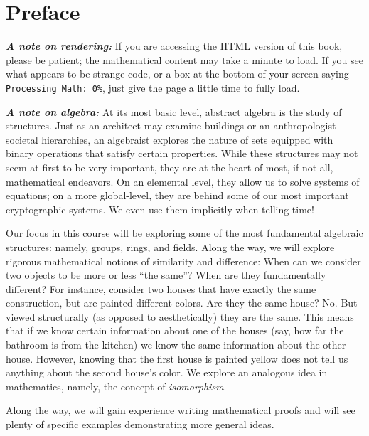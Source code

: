 \documentclass[10pt,openany,oneside]{book}
\newcommand{\alert}[1]{\textbf{\textit{#1}}}
\theoremstyle{plain}
\theoremstyle{definition}
\theoremstyle{definition}
\theoremstyle{definition}
\theoremstyle{definition}
\numberwithin{equation}{section}
\begin{document}
\chapter*{Preface}\label{preface-1}
\alert{A note on rendering:} If you are accessing the HTML version of this book, please be patient; the mathematical content may take a minute to load. If you see what appears to be strange code, or a box at the bottom of your screen saying \lstinline?Processing Math: 0%?, just give the page a little time to fully load.%
\par
\alert{A note on algebra:} At its most basic level, abstract algebra is the study of structures. Just as an architect may examine buildings or an anthropologist societal hierarchies, an algebraist explores the nature of sets equipped with binary operations that satisfy certain properties. While these structures may not seem at first to be very important, they are at the heart of most, if not all, mathematical endeavors. On an elemental level, they allow us to solve systems of equations; on a more global-level, they are behind some of our most important cryptographic systems. We even use them implicitly when telling time!%
\par
Our focus in this course will be exploring some of the most fundamental algebraic structures: namely, groups, rings, and fields. Along the way, we will explore rigorous mathematical notions of similarity and difference: When can we consider two objects to be more or less ``the same''? When are they fundamentally different? For instance, consider two houses that have exactly the same construction, but are painted different colors. Are they the same house? No. But viewed structurally (as opposed to aesthetically) they are the same. This means that if we know certain information about one of the houses (say, how far the bathroom is from the kitchen) we know the same information about the other house. However, knowing that the first house is painted yellow does not tell us anything about the second house's color. We explore an analogous idea in mathematics, namely, the concept of \emph{isomorphism}.%
\par
Along the way, we will gain experience writing mathematical proofs and will see plenty of specific examples demonstrating more general ideas.%
\setcounter{tocdepth}{1}
\renewcommand*\contentsname{Contents}
\tableofcontents
\mainmatter
\typeout{************************************************}
\typeout{************************************************}
\end{document}
